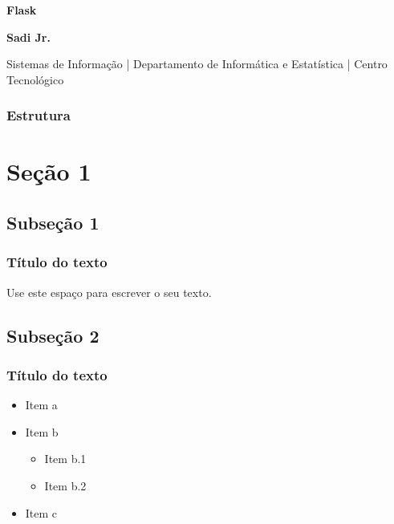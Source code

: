 \documentclass[t]{beamer}
\begin{document}
{
	\begin{frame}[plain]
		\vspace{18mm}
		\begin{flushright}
			\textcolor{cinza}{\textbf{\huge{
				Flask
			}}}
		\end{flushright}
		
		\vspace{-6mm}
		\begin{flushright}
			\textcolor{cinza}{\textbf{\scriptsize{
				Sadi Jr.
			}}}
		\end{flushright}
		
		\vspace{-7mm}
		\begin{flushright}
			\textcolor{cinza}{\scriptsize{
				Sistemas de Informação | Departamento de Informática e Estatística | Centro Tecnológico
			}}
		\end{flushright}
		
		
	\end{frame}
}

\begin{frame}
	\frametitle{Estrutura}
	\tableofcontents
\end{frame}

\section{Seção 1}

\subsection{Subseção 1}

\begin{frame}
	\frametitle{Título do texto}
	Use este espaço para escrever o seu texto.
\end{frame}

\subsection*{Subseção 2}

\begin{frame}
	\frametitle{Título do texto}
	\begin{itemize}
		\item Item a
		\item Item b
		      \begin{itemize}
		      	\item Item b.1
		      	\item Item b.2
		      \end{itemize}
		\item Item c
	\end{itemize}
\end{frame}
\end{document}
